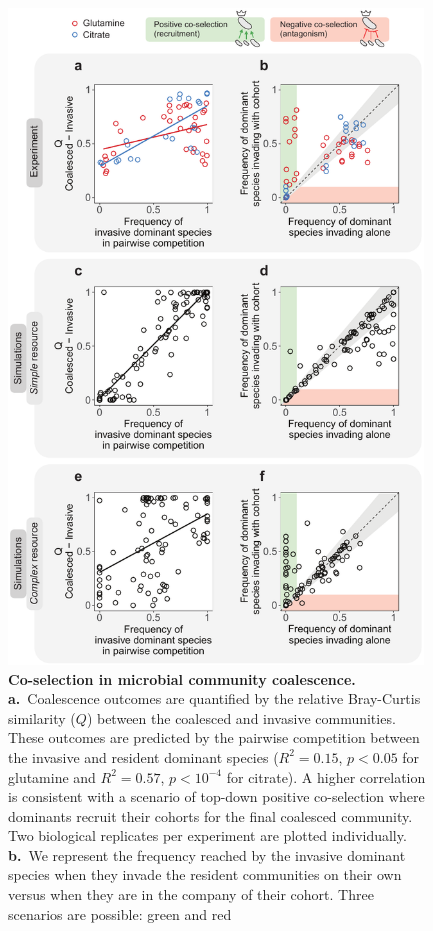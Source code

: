 \documentclass[a4paper,10pt]{article}
\begin{document}
\clearpage

\begin{figure}[!h]
\centering
\internallinenumbers
\includegraphics[width=11cm,keepaspectratio]{figs/fig2.pdf}
\caption{\textbf{Co-selection in microbial community coalescence.}
\textbf{a.}~Coalescence outcomes are quantified by the relative Bray-Curtis similarity
($Q$) between the coalesced and invasive communities.
These outcomes are predicted by the pairwise competition between the invasive and
resident dominant species
($R^2=0.15$, $p<0.05$ for glutamine and $R^2=0.57$, $p<10^{-4}$ for citrate).
A higher correlation is consistent with a scenario of
top-down positive co-selection where dominants recruit their cohorts for the final
coalesced community. Two biological replicates per experiment are plotted individually.
\textbf{b.}~We represent the frequency reached by
the invasive dominant species when they invade the resident communities on their own versus
when they are in the company of their cohort.
Three scenarios are possible: green and red
}
\end{figure}
\end{document}
